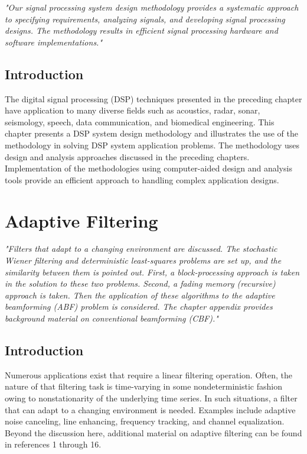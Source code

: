 \documentclass[11pt]{book}
\theoremstyle{example}
\begin{document}
\begin{center}
\textit{"Our signal processing system design methodology provides a systematic approach to specifying requirements, analyzing signals, and developing signal processing designs. The methodology results in efficient signal processing hardware and software implementations."}
\end{center}
\vspace{1em}
\setcounter{section}{-1}
\section{Introduction}
The digital signal processing (DSP) techniques presented in the preceding chapter have application to many diverse fields such as acoustics, radar, sonar, seismology, speech, data communication, and biomedical engineering. This chapter presents a DSP system design methodology and illustrates the use of the methodology in solving DSP system application problems. The methodology uses design and analysis approaches discussed in the preceding chapters. Implementation of the methodologies using computer-aided design and analysis tools provide an efficient approach to handling complex application designs.

\chapter{Adaptive Filtering}
\begin{center}
\textit{"Filters that adapt to a changing environment are discussed. The stochastic Wiener filtering and deterministic least-squares problems are set up, and the similarity between them is pointed out. First, a block-processing approach is taken in the solution to these two problems. Second, a fading memory (recursive) approach is taken. Then the application of these algorithms to the adaptive beamforming (ABF) problem is considered. The chapter appendix provides background material on conventional beamforming (CBF)."}
\end{center}
\vspace{1em}
\setcounter{section}{-1}
\section{Introduction}
Numerous applications exist that require a linear filtering operation. Often, the nature of that filtering task is time-varying in some nondeterministic fashion owing to nonstationarity of the underlying time series. In such situations, a filter that can adapt to a changing environment is needed. Examples include adaptive noise canceling, line enhancing, frequency tracking, and channel equalization. Beyond the discussion here, additional material on adaptive filtering can be found in references 1 through 16.
\end{document}
